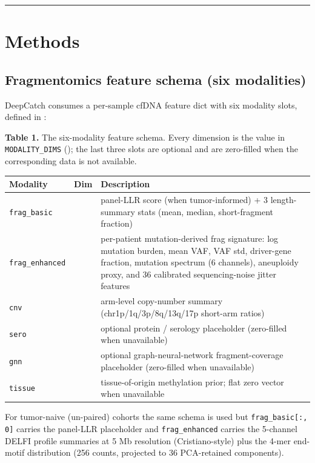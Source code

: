 \documentclass[11pt]{article}
\begin{document}
\par\bigskip\hrule\bigskip
\section{Methods}
\subsection{Fragmentomics feature schema (six modalities)}
DeepCatch consumes a per-sample cfDNA feature dict with six modality slots, defined in :

\textbf{Table 1.} The six-modality feature schema. Every dimension is the value in \texttt{MODALITY\_\allowbreak{}DIMS} (); the last three slots are optional and are zero-filled when the corresponding data is not available.

\begin{table}[htbp]
\centering
\small
\begin{tabular}{>{\raggedright\arraybackslash}p{}>{\raggedleft\arraybackslash}p{}>{\raggedright\arraybackslash}p{}}
\toprule
Modality & Dim & Description \\
\midrule
\texttt{frag\_\allowbreak{}basic} & 4 & panel-LLR score (when tumor-informed) + 3 length-summary stats (mean, median, short-fragment fraction) \\
\texttt{frag\_\allowbreak{}enhanced} & 44 & per-patient mutation-derived frag signature: log mutation burden, mean VAF, VAF std, driver-gene fraction, mutation spectrum (6 channels), aneuploidy proxy, and 36 calibrated sequencing-noise jitter features \\
\texttt{cnv} & 6 & arm-level copy-number summary (chr1p/1q/3p/8q/13q/17p short-arm ratios) \\
\texttt{sero} & 4 & optional protein / serology placeholder (zero-filled when unavailable) \\
\texttt{gnn} & 1 & optional graph-neural-network fragment-coverage placeholder (zero-filled when unavailable) \\
\texttt{tissue} & 24 & tissue-of-origin methylation prior; flat zero vector when unavailable \\
\bottomrule
\end{tabular}
\end{table}

For tumor-naive (un-paired) cohorts the same schema is used but \texttt{frag\_\allowbreak{}basic[:, 0]} carries the panel-LLR placeholder and \texttt{frag\_\allowbreak{}enhanced} carries the 5-channel DELFI profile summaries at 5 Mb resolution (Cristiano-style) plus the 4-mer end-motif distribution (256 counts, projected to 36 PCA-retained components).
\end{document}
